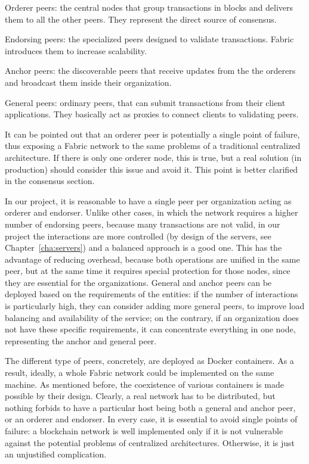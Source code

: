 \begin{description}
    \item Orderer peers: the central nodes that group transactions in blocks and delivers them to all the other peers. They represent the direct source of consensus.
    \item Endorsing peers: the specialized peers designed to validate transactions. Fabric introduces them to increase scalability.
    \item Anchor peers: the discoverable peers that receive updates from the the orderers and broadcast them inside their organization.
    \item General peers: ordinary peers, that can submit transactions from their client applications. They basically act as proxies to connect clients to validating peers.
\end{description}

It can be pointed out that an orderer peer is potentially a single point of failure, thus exposing a Fabric network to the same problems of a traditional centralized architecture. If there is only one orderer node, this is true, but a real solution (in production) should consider this issue and avoid it. This point is better clarified in the consensus section.

In our project, it is reasonable to have a single peer per organization acting as orderer and endorser. Unlike other cases, in which the network requires a higher number of endorsing peers, because many transactions are not valid, in our project the interactions are more controlled (by design of the servers, see Chapter~\ref{cha:servers}) and a balanced approach is a good one. This has the advantage of reducing overhead, because both operations are unified in the same peer, but at the same time it requires special protection for those nodes, since they are essential for the organizations. General and anchor peers can be deployed based on the requirements of the entities: if the number of interactions is particularly high, they can consider adding more general peers, to improve load balancing and availability of the service; on the contrary, if an organization does not have these specific requirements, it can concentrate everything in one node, representing the anchor and general peer.

The different type of peers, concretely, are deployed as Docker containers. As a result, ideally, a whole Fabric network could be implemented on the same machine. As mentioned before, the coexistence of various containers is made possible by their design. Clearly, a real network has to be distributed, but nothing forbids to have a particular host being both a general and anchor peer, or an orderer and endorser. In every case, it is essential to avoid single points of failure: a blockchain network is well implemented only if it is not vulnerable against the potential problems of centralized architectures. Otherwise, it is just an unjustified complication.


